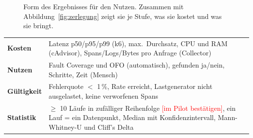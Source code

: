 \documentclass[11pt, a4paper]{article}
\newcommand{\offen}[1]{\textcolor{red}{[#1]}}
\begin{document}
\begin{figure}[H]
\centering
{}
\caption[Ergebnis-Matrix Nutzen]{Form des Ergebnisses für den Nutzen. Zusammen mit Abbildung~\ref{fig:zerlegung} zeigt sie je Stufe, was sie kostet und was sie bringt.}
\label{fig:matrix}
\end{figure}

\begin{center}
\small
\begin{tabularx}{\textwidth}{@{}l X@{}}
\toprule
\textbf{Kosten} & Latenz p50/p95/p99 (k6), max.\ Durchsatz, CPU und RAM (cAdvisor), Spans/Logs/Bytes pro Anfrage (Collector) \\
\textbf{Nutzen} & Fault Coverage und OFO (automatisch), gefunden ja/nein, Schritte, Zeit (Mensch) \\
\textbf{Gültigkeit} & Fehlerquote $<$ 1\,\%, Rate erreicht, Lastgenerator nicht ausgelastet, keine verworfenen Spans \\
\textbf{Statistik} & $\ge$ 10 Läufe in zufälliger Reihenfolge \offen{im Pilot bestätigen}, ein Lauf = ein Datenpunkt, Median mit Konfidenzintervall, Mann-Whitney-U und Cliff's Delta \cite{georges2007rigorous,kalibera2013rigorous} \\
\bottomrule
\end{tabularx}
\end{center}
\end{document}
